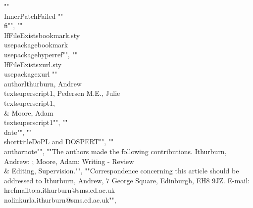 {{""    {}{\\InnerPatchFailed}%
""\\fi"", ""\\IfFileExists{bookmark.sty}{\\usepackage{bookmark}}{\\usepackage{hyperref}}"", ""\\IfFileExists{xurl.sty}{\\usepackage{xurl}}{} %
""\\author{Ithurburn, Andrew\\textsuperscript{1}, Pedersen M.E., Julie\\textsuperscript{1}, \\& Moore, Adam\\textsuperscript{1}}"", ""\\date{}"", ""\\shorttitle{DoPL and DOSPERT}"", ""\\authornote{"", ""The authors made the following contributions. Ithurburn, Andrew: ; Moore, Adam: Writing - Review \\& Editing, Supervision."", ""Correspondence concerning this article should be addressed to Ithurburn, Andrew, 7 George Square, Edinburgh, EH8 9JZ. E-mail: \\href{mailto:a.ithurburn@sms.ed.ac.uk}{\\nolinkurl{a.ithurburn@sms.ed.ac.uk}}"", 
}}}
